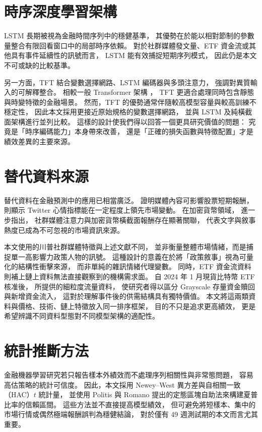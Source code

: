 \section{時序深度學習架構}

LSTM \citep{hochreiter1997long,fischer2018lstm_finance} 長期被視為金融時間序列中的穩健基準，
其優勢在於能以相對節制的參數量整合有限回看窗口中的局部時序依賴。
對於社群媒體發文量、ETF 資金流或其他具有事件延續性的訊號而言，
LSTM 能有效捕捉短期序列模式，
因此仍是本文不可或缺的比較基準。

另一方面，TFT \citep{lim2021temporal} 結合變數選擇網路、LSTM 編碼器與多頭注意力，
強調對異質輸入的可解釋整合。
相較一般 Transformer 架構 \citep{vaswani2017attention}，
TFT 更適合處理同時包含靜態與時變特徵的金融場景。
然而，TFT 的優勢通常伴隨較高模型容量與較高訓練不穩定性，
因此本文採用更接近原始規格的變數選擇網路，
並與 LSTM 及純橫截面架構進行並列比較。
這樣的設計使我們得以回答一個更具研究價值的問題：
究竟是「時序編碼能力」本身帶來改善，
還是「正確的損失函數與特徵配置」才是績效差異的主要來源。

\section{替代資料來源}

替代資料在金融預測中的應用已相當廣泛。
\citet{tetlock2007giving} 證明媒體內容可影響股票短期報酬，
\citet{bollen2011twitter} 則顯示 Twitter 心情指標能在一定程度上領先市場變動。
在加密貨幣領域，\citet{maitre2025social} 進一步指出，
社群媒體注意力與加密貨幣橫截面報酬存在顯著關聯，
代表文字與敘事熱度已成為不可忽視的市場資訊來源。

本文使用的川普社群媒體特徵與上述文獻不同，
並非衡量整體市場情緒，而是捕捉單一高影響力政策人物的訊號。
這種設計的意義在於將「政策敘事」視為可量化的結構性衝擊來源，
而非單純的雜訊情緒代理變數。
同時，ETF 資金流資料則補上鏈上資料無法直接觀察到的機構需求面。
自 2024 年 1 月現貨比特幣 ETF 核准後，
\citet{bitcoin_etf_farside} 所提供的細粒度流量資料，
使研究者得以區分 Grayscale 存量資金贖回與新增資金流入，
這對於理解事件後的供需結構具有獨特價值。
本文將這兩類資料與價格、技術、鏈上特徵放入同一排序框架，
目的不只是追求更高績效，
更是希望辨識不同資料型態對不同模型架構的適配性。

\section{統計推斷方法}

金融機器學習研究若只報告樣本外績效而不處理序列相關性與非常態問題，
容易高估策略的統計可信度。
因此，本文採用 Newey--West
\citep{newey1987simple,newey1994automatic}
異方差與自相關一致（HAC）$t$ 統計量，
並使用 Politis 與 Romano \citep{politis1994stationary}
提出的定態區塊自助法來構建夏普比率的信賴區間。
這些方法並不直接提高模型績效，
但可避免將短樣本、集中的市場行情或偶然極端報酬誤判為穩健結論，
對於僅有 49 週測試期的本文而言尤其重要。
